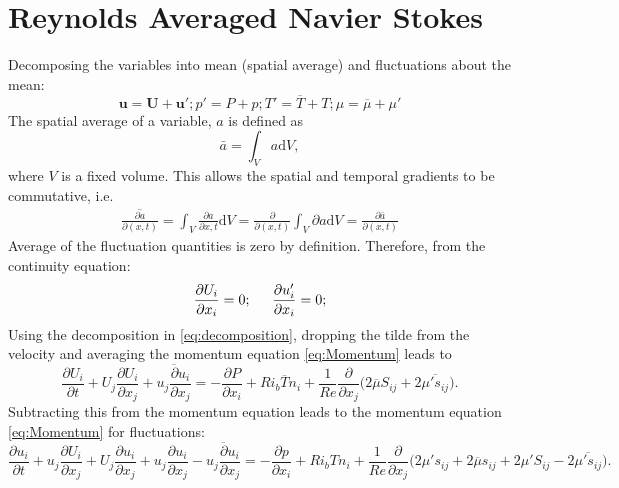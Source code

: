 \documentclass[preprint,12pt]{article}
\begin{document}
\section{Reynolds Averaged Navier Stokes}
Decomposing the variables into mean (spatial average) and fluctuations about the mean:
\begin{equation}\label{eq:decomposition}
\mathbf{u}={\mathbf{U}}+\mathbf{u}'; {p'}=P+{p};  T'=\overline{T}+{T};  \mu=\overline{\mu}+\mu' 
\end{equation}
The spatial average of a variable, $a$ is defined as
\begin{equation}
\bar{a}=\int_V a \text{d}V,
\end{equation}
where $V$ is a fixed volume. This allows the spatial and temporal gradients to be commutative, i.e.
\begin{eqnarray}
\overline{\frac{\partial a}{\partial (x,t)}}=\int_V \frac{\partial a}{\partial x,t} \text{d}V=\frac{\partial }{\partial (x,t)}\int_V \partial a \text{d}V=\frac{\partial\bar{a}}{\partial (x,t)}
\end{eqnarray}
Average of the fluctuation quantities is zero by definition. Therefore, from the continuity equation:
\begin{equation}
\frac{\partial U_i}{\partial x_i}=0; \hspace{0.2in}\frac{\partial u_i'}{\partial x_i}=0;
\end{equation}
Using the decomposition in \eqref{eq:decomposition}, dropping the tilde from the velocity and averaging the momentum equation \eqref{eq:Momentum} leads to
\begin{equation}\label{eq:momentum_average}
\frac{\partial {U_i}}{\partial t}+U_j\frac{\partial U_i}{\partial x_j}+\overline{u_j\frac{\partial u_i}{\partial x_j}}=-\frac{\partial P}{\partial x_i}+{Ri_b\overline{T}} n_{i}+{\frac{1}{Re}}\frac{\partial}{\partial x_j}\Big(2{\overline{\mu}}S_{ij}+2\overline{{\mu}'s_{ij}}\Big).
\end{equation}
Subtracting this from the momentum equation leads to the momentum equation \eqref{eq:Momentum} for fluctuations:
\begin{equation}\label{eq:momentum_fluctuations}
\frac{\partial {u_i}}{\partial t}+u_j\frac{\partial U_i}{\partial x_j}+U_j\frac{\partial u_i}{\partial x_j}+u_j\frac{\partial u_i}{\partial x_j}-\overline{u_j\frac{\partial u_i}{\partial x_j}}=-\frac{\partial p}{\partial x_i}+{Ri_b{T}} n_i+{\frac{1}{Re}}\frac{\partial}{\partial x_j}\Big(2{{\mu'}}s_{ij}+2{\overline{\mu}}s_{ij}+2{{\mu'}}S_{ij}-2\overline{{\mu}'s_{ij}}\Big).
\end{equation}
\end{document}
